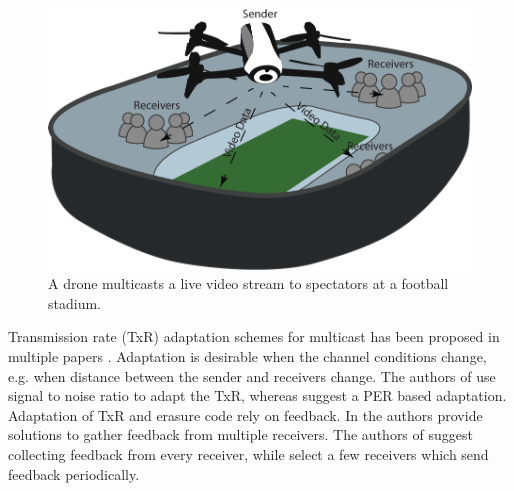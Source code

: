 \begin{figure}[t]
  \centering
  \includegraphics[width=\linewidth]{images/DroneIsolated.pdf}
  \caption{A drone multicasts a live video stream to spectators at a football stadium.}
  \label{fig:drone}
\end{figure}




%
%	
%	

	Transmission rate (TxR) adaptation schemes for multicast has been proposed in multiple papers \cite{SARM,rate_adapt_diff_rates,amuse}. Adaptation is desirable when the channel conditions change, e.g. when distance between the sender and receivers change. The authors of \cite{SARM} use signal to noise ratio to adapt the TxR, whereas \cite{rate_adapt_diff_rates} suggest a PER based adaptation. Adaptation of TxR and erasure code rely on feedback. In \cite{vid_rate,amuse} the authors provide solutions to gather feedback from multiple receivers. The authors of \cite{vid_rate} suggest collecting feedback from every receiver, while \cite{amuse} select a few receivers which send feedback periodically.

